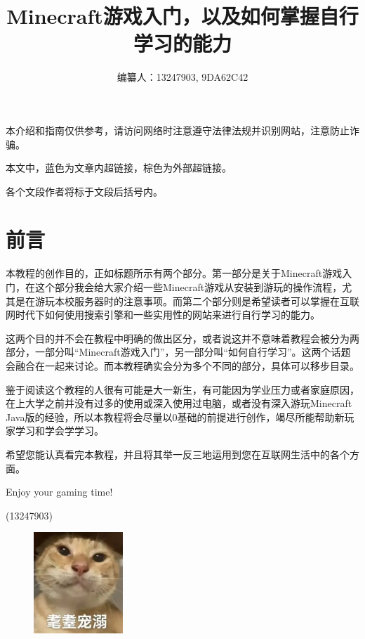 \documentclass[UTF8,a4paper]{article}
\title{Minecraft游戏入门，以及如何掌握自行学习的能力}
\author{编纂人：13247903, 9DA62C42}
\begin{document}
	\maketitle
	\tableofcontents
	\newpage
	\par 本介绍和指南仅供参考，请访问网络时注意遵守法律法规并识别网站，注意防止诈骗。
	\par 本文中，蓝色为文章内超链接，棕色为外部超链接。
	\par 各个文段作者将标于文段后括号内。

	\section*{前言}
		\par 本教程的创作目的，正如标题所示有两个部分。第一部分是关于Minecraft游戏入门，在这个部分我会给大家介绍一些Minecraft游戏从安装到游玩的操作流程，尤其是在游玩本校服务器时的注意事项。而第二个部分则是希望读者可以掌握在互联网时代下如何使用搜索引擎和一些实用性的网站来进行自行学习的能力。
		\par 这两个目的并不会在教程中明确的做出区分，或者说这并不意味着教程会被分为两部分，一部分叫“Minecraft游戏入门”，另一部分叫“如何自行学习”。这两个话题会融合在一起来讨论。而本教程确实会分为多个不同的部分，具体可以移步目录。
		\par 鉴于阅读这个教程的人很有可能是大一新生，有可能因为学业压力或者家庭原因，在上大学之前并没有过多的使用或深入使用过电脑，或者没有深入游玩Minecraft Java版的经验，所以本教程将会尽量以0基础的前提进行创作，竭尽所能帮助新玩家学习和学会学学习。
		\par 希望您能认真看完本教程，并且将其举一反三地运用到您在互联网生活中的各个方面。
		\par Enjoy your gaming time!
		\begin{flushright}(13247903)\end{flushright}
		\begin{figure}[H] %
			\centering %
			\includegraphics[width=0.3\textwidth]{./Pictures/maodiechongni.png} %
		\end{figure}
	
\end{document}
